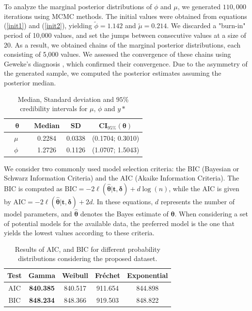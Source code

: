 \documentclass[]{interact}
\theoremstyle{plain}%
\theoremstyle{definition}
\theoremstyle{remark}
\begin{document}
To analyze the marginal posterior distributions of $\phi$ and $\mu$, we generated $110,000$ iterations using MCMC methods. The initial values were obtained from equations (\ref{init1}) and (\ref{init2}), yielding $\tilde{\phi}=1.142$ and $\tilde{\mu}=0.214$. We discarded a "burn-in" period of 10,000 values, and set the jumps between consecutive values at a size of 20. As a result, we obtained chains of the marginal posterior distributions, each consisting of 5,000 values. We assessed the convergence of these chains using Geweke's diagnosis \cite{geweke1991evaluating}, which confirmed their convergence.  Due to the asymmetry of the generated sample, we computed the posterior estimates assuming the posterior median.
\begin{table}[!h]
	\caption{Median, Standard deviation and  $95\%$ credibility intervals for $\mu$, $\phi$ and $y*$}
	\centering %
{\small
	{\begin{tabular}{ c | c |  c| c }
			\hline
			$\boldsymbol{\theta}$  & Median & SD & CI$_{95\%}(\boldsymbol{\theta})$ \\ \hline
			\ \ $\mu$ \ \   & 0.2284 &  0.0338  &  (0.1704; 0.3010)  \\ \hline
			\ \ $\phi$   \ \  &  1.2726 & 0.1126 &  (1.0707; 1.5043) \\ \hline
		\end{tabular}}\label{resairplane} }
\end{table}

We consider two commonly used model selection criteria: the BIC (Bayesian or Schwarz Information Criteria) and the AIC (Akaike Information Criteria). The BIC is computed as $\text{BIC} = -2 \ell(\hat{\boldsymbol{\theta}}|\boldsymbol{t,\delta}) + d\log(n)$, while the AIC is given by $\text{AIC} = -2 \ell(\hat{\boldsymbol{\theta}}|\boldsymbol{t,\delta}) + 2d$. In these equations, $d$ represents the number of model parameters, and $\hat{\boldsymbol{\theta}}$ denotes the Bayes estimate of $\boldsymbol{\theta}$. When considering a set of potential models for the available data, the preferred model is the one that yields the lowest values according to these criteria.

\begin{table}[!h]
\centering %
	\caption{Results of AIC, and BIC for different probability distributions considering the proposed dataset.}

	{\begin{tabular}{c|c|c|c|c}
			\hline
			Test   &  Gamma & Weibull & Fréchet & Exponential \\ \hline
			AIC    & \textbf{840.385} & 840.517 & 911.654 & 844.898 \\ 
			BIC    & \textbf{848.234} & 848.366 & 919.503 & 848.822  \\ \hline
		\end{tabular}}\label{discairplane}
\end{table}
\end{document}
